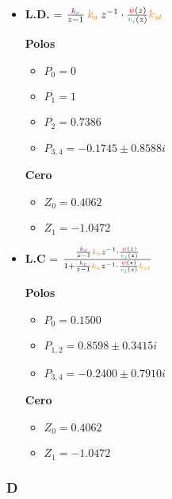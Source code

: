  \begin{itemize}
  \item \textbf{L.D.} = \( \frac{\mora{k_{c}}}{z-1} \nara{ k_{a}} z^{-1} \cdot \frac{\rojo{\psi}(z)}{\verd{v_i}(z)} \nara{k_{st}} \) 
  
  \begin{multicols}{2}
    \textbf{Polos}
    \begin{itemize}
      \item \(P_{0} = 0 \)
      \item \(P_{1} = 1 \)
      \item \(P_{2} = 0.7386\)
      \item \(P_{3,4} = -0.1745 \pm 0.8588i\) 
    \end{itemize}
    \columnbreak
    \textbf{Cero}
    \begin{itemize}
        \item \(Z_0 = 0.4062\)
        \item \(Z_1 = -1.0472\)
    \end{itemize}
  \end{multicols}


  \item \textbf{L.C} =  \(\frac{ \frac{\mora{k_{c}}}{z-1} \nara{ k_{a}} z^{-1} \cdot \frac{\rojo{\psi}(z)}{\verd{v_i}(z)}} {1+ \frac{\mora{k_{c}}}{z-1} \nara{ k_{a}} z^{-1} \cdot \frac{\rojo{\psi}(z)}{\verd{v_i}(z)} \nara{k_{st}} }  \)
  
  \begin{multicols}{2}
    \textbf{Polos}
    \begin{itemize}
      \item \(P_{0} = 0.1500 \)
      \item \(P_{1,2} = 0.8598 \pm 0.3415i\)
      \item \(P_{3,4} = -0.2400 \pm 0.7910i\) 
    \end{itemize}
    \columnbreak
    \textbf{Cero}
    \begin{itemize}
        \item \(Z_0 = 0.4062\)
        \item \(Z_1 = -1.0472\)
    \end{itemize}
  \end{multicols}
 \end{itemize}





\FloatBarrier
\subsubsection{D}%

